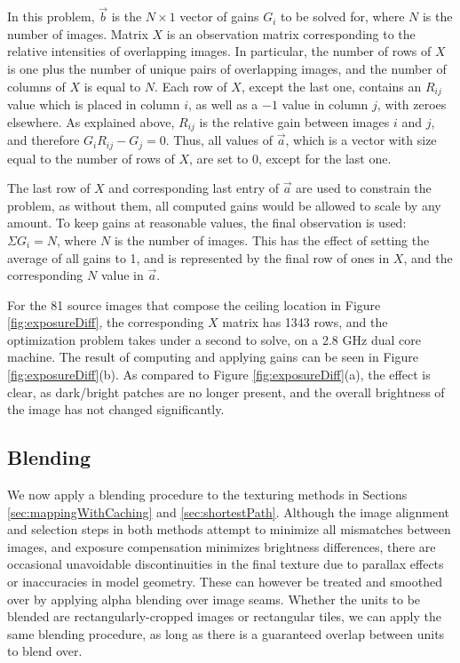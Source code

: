 \documentclass[]{spie}  %
\begin{document}
In this problem, $\vec{b}$ is the $N\times1$ vector of gains $G_i$ to
be solved for, where $N$ is the number of images.  Matrix $X$ is an
observation matrix corresponding to the relative intensities of
overlapping images. In particular, the number of rows of $X$ is one
plus the number of unique pairs of overlapping images, and the number
of columns of $X$ is equal to $N$. Each row of $X$, except the last
one, contains an $R_{ij}$ value which is placed in column $i$, as well
as a $-1$ value in column $j$, with zeroes elsewhere. As explained
above, $R_{ij}$ is the relative gain between images $i$ and $j$, and
therefore $G_iR_{ij} - G_j = 0$.  Thus, all values of $\vec{a}$, which
is a vector with size equal to the number of rows of $X$, are set to
$0$, except for the last one.

The last row of $X$ and corresponding last entry of $\vec{a}$ are used
to constrain the problem, as without them, all computed gains would be
allowed to scale by any amount. To keep gains at reasonable values,
the final observation is used: $\Sigma G_i = N$, where $N$ is the
number of images. This has the effect of setting the average of all
gains to 1, and is represented by the final row of ones in $X$, and
the corresponding $N$ value in $\vec{a}$.

For the 81 source images that compose the ceiling location in Figure
\ref{fig:exposureDiff}, the corresponding $X$ matrix has 1343 rows,
and the optimization problem takes under a second to solve, on a 2.8
GHz dual core machine.  The result of computing and applying gains can
be seen in Figure \ref{fig:exposureDiff}(b). As compared to Figure
\ref{fig:exposureDiff}(a), the effect is clear, as dark/bright patches
are no longer present, and the overall brightness of the image has not
changed significantly.

\subsection{Blending}
\label{sec:blending}
We now apply a blending procedure to the texturing methods in Sections
\ref{sec:mappingWithCaching} and \ref{sec:shortestPath}. Although the
image alignment and selection steps in both methods attempt to
minimize all mismatches between images, and exposure compensation
minimizes brightness differences, there are occasional unavoidable
discontinuities in the final texture due to parallax effects or
inaccuracies in model geometry. These can however be treated and
smoothed over by applying alpha blending over image seams.  Whether
the units to be blended are rectangularly-cropped images or
rectangular tiles, we can apply the same blending procedure, as long
as there is a guaranteed overlap between units to blend over.
\end{document}
